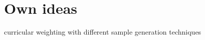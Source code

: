 \section{Own ideas}\label{sec:own_ideas}













curricular weighting with different sample generation techniques


